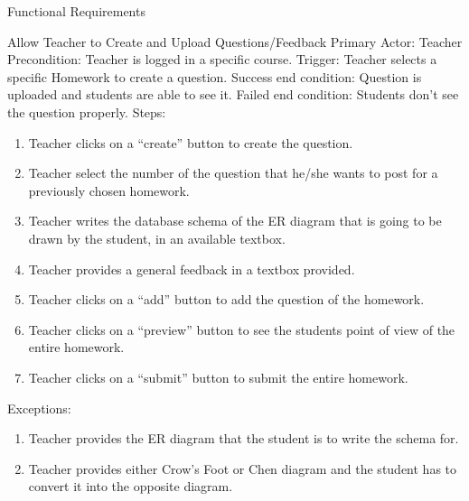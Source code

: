 \documentclass{article}
\begin{document}
\begin{section}{Functional Requirements}
\begin{subsection}{Allow Teacher to Create and Upload       Questions/Feedback}
    Primary Actor: Teacher \newline
    Precondition: Teacher is logged in a specific course. \newline
    Trigger: Teacher selects a specific Homework to create a     question. \newline
    Success end condition: Question is uploaded and students     are able to see it. \newline
    Failed end condition: Students don’t see the question       properly. \newline
    \newline
    Steps:
    \begin{enumerate}
    \item{Teacher clicks on a “create” button to create the           question.}
    \item{Teacher select the number of the question that             he/she wants to post for a previously chosen               homework.}
    \item{Teacher writes the database schema of the ER              diagram that is going to be drawn by the student, in         an available textbox.}
    \item{Teacher provides a general feedback in a textbox            provided.}
    \item{Teacher clicks on a “add” button to add the                 question of the homework.}
    \item{Teacher clicks on a “preview” button to see the           students point of view of the entire homework.}
    \item{Teacher clicks on a “submit” button to submit the           entire homework.}
    \end{enumerate}
    Exceptions:
    \begin{enumerate}
    \item{Teacher provides the ER diagram that the student          is to write the schema for.}
    \item{Teacher provides either Crow’s Foot or Chen           diagram and the student has to convert it into the          opposite diagram.}
    \end{enumerate}
    \end{subsection}
    

\end{section}
\end{document}
